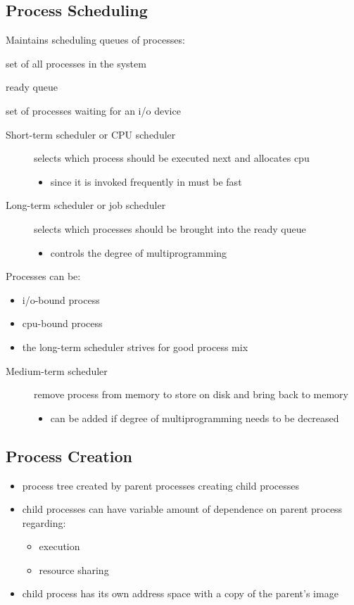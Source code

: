 \documentclass[11pt]{article}
\begin{document}
\subsection{Process Scheduling}
\label{sec:org07a4145}
Maintains scheduling queues of processes:
\begin{description}
\item[{job queue}] set of all processes in the system
\item ready queue
\item[{device queues}] set of processes waiting for an i/o device
\end{description}
\begin{description}
\item[{Short-term scheduler or CPU scheduler}] selects which process should be executed next and allocates cpu 
\begin{itemize}
\item since it is invoked frequently in must be fast
\end{itemize}
\item[{Long-term scheduler or job scheduler}] selects which processes should be brought into the ready queue
\begin{itemize}
\item controls the degree of multiprogramming
\end{itemize}
\end{description}
Processes can be:
\begin{itemize}
\item i/o-bound process
\item cpu-bound process
\item the long-term scheduler strives for good process mix
\end{itemize}
\begin{description}
\item[{Medium-term scheduler}] remove process from memory to store on disk and bring back to memory
\begin{itemize}
\item can be added if degree of multiprogramming needs to be decreased
\end{itemize}
\end{description}
\subsection{Process Creation}
\label{sec:orgcb7e291}
\begin{itemize}
\item process tree created by parent processes creating child processes
\item child processes can have variable amount of dependence on parent process regarding:
\begin{itemize}
\item execution
\item resource sharing
\end{itemize}
\item child process has its own address space with a copy of the parent's image
\end{itemize}
\end{document}
